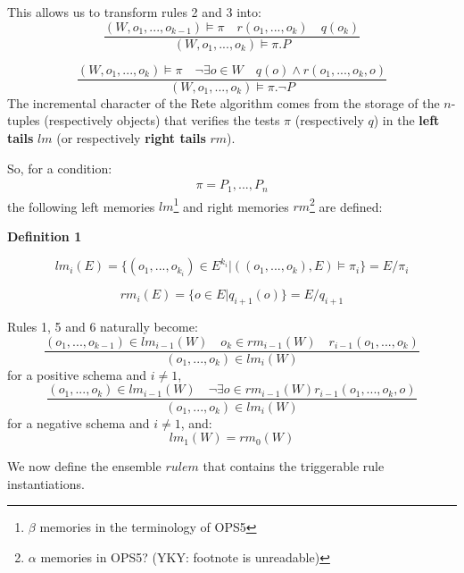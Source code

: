 This allows us to transform rules 2 and 3 into:
\begin{equation}
\frac{(W, o_1, ..., o_{k-1}) \vDash \pi \quad r(o_1, ..., o_k) \quad q(o_k)}
{(W, o_1, ..., o_k) \vDash \pi . P}
\end{equation}

\begin{equation}
\frac{(W, o_1, ..., o_{k}) \vDash \pi \quad \neg \exists o \in W \quad q(o) \wedge r(o_1, ..., o_k, o)}
{(W, o_1, ..., o_k) \vDash \pi . \neg P}
\end{equation}
The incremental character of the Rete algorithm comes from the storage of the $n$-tuples (respectively objects) that verifies the tests $\pi$ (respectively $q$) in the \textbf{left tails} $lm$ (or respectively \textbf{right tails} $rm$).

So, for a condition:
\begin{eqnarray}
\pi = P_1, ..., P_n \nonumber
\end{eqnarray}
the following left memories $lm$\footnote{$\beta$ memories in the terminology of OPS5} and right memories $rm$\footnote{$\alpha$ memories in OPS5? (YKY: footnote is unreadable)} are defined:

\textbf{Definition 1}

\begin{equation}
lm_i (E) = \{ (o_1, ..., o_{k_i}) \in E^{k_i} | ((o_1, ..., o_k), E ) \vDash \pi_i \} = E / \pi_i
\nonumber
\end{equation}

\begin{equation}
rm_i (E) = \{ o \in E | q_{i+1}(o) \} = E / q_{i+1}
\nonumber
\end{equation}

Rules 1, 5 and 6 naturally become:
\begin{equation}
\frac{(o_1, ..., o_{k-1}) \in lm_{i-1} (W) \quad o_k \in rm_{i-1} (W) \quad r_{i-1}(o_1, ..., o_k)}
{(o_1, ..., o_k) \in lm_i (W)}
\end{equation}
for a positive schema and $i \neq 1$,
\begin{equation}
\frac{(o_1, ..., o_{k}) \in lm_{i-1} (W) \quad \neg \exists o \in rm_{i-1} (W) r_{i-1}(o_1, ..., o_k, o)}
{(o_1, ..., o_k) \in lm_i (W)}
\end{equation}
for a negative schema and $i \neq 1$, and:
\begin{equation}
lm_1 (W) = rm_0 (W)
\end{equation}

We now define the ensemble $rulem$ that contains the triggerable rule instantiations.

